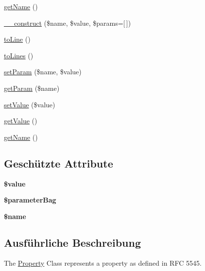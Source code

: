 \begin{DoxyCompactItemize}
\item 
\mbox{\hyperlink{class_eluceo_1_1i_cal_1_1_property_ab53aefdbce4aa167f433cac2959c2c66}{get\+Name}} ()
\item 
\mbox{\hyperlink{class_eluceo_1_1i_cal_1_1_property_aeb192572ca706cb77df02d439c3f6ce4}{\+\_\+\+\_\+construct}} (\$name, \$value, \$params=\mbox{[}$\,$\mbox{]})
\item 
\mbox{\hyperlink{class_eluceo_1_1i_cal_1_1_property_a8b154e23bd0673f5afb2b6fd450991f2}{to\+Line}} ()
\item 
\mbox{\hyperlink{class_eluceo_1_1i_cal_1_1_property_a815fd5c038ec6f86b9f117f2e3d5bb7f}{to\+Lines}} ()
\item 
\mbox{\hyperlink{class_eluceo_1_1i_cal_1_1_property_a0df0ae305338da8badb77919fbd21253}{set\+Param}} (\$name, \$value)
\item 
\mbox{\hyperlink{class_eluceo_1_1i_cal_1_1_property_aa0fea66f4397d19a9c553aabd234b26e}{get\+Param}} (\$name)
\item 
\mbox{\hyperlink{class_eluceo_1_1i_cal_1_1_property_acc3c37832aaf1876944f9c13119dfb7b}{set\+Value}} (\$value)
\item 
\mbox{\hyperlink{class_eluceo_1_1i_cal_1_1_property_a2e565cd9324a1f802c741224c9c78864}{get\+Value}} ()
\item 
\mbox{\hyperlink{class_eluceo_1_1i_cal_1_1_property_ab53aefdbce4aa167f433cac2959c2c66}{get\+Name}} ()
\end{DoxyCompactItemize}
\subsection*{Geschützte Attribute}
\begin{DoxyCompactItemize}
\item 
\mbox{\label{class_eluceo_1_1i_cal_1_1_property_a6b134305c2e64a01133701186ffecaed}} 
{\bfseries \$value}
\item 
\mbox{\label{class_eluceo_1_1i_cal_1_1_property_a53a276518453b3dae2d8aa2040a81081}} 
{\bfseries \$parameter\+Bag}
\item 
\mbox{\label{class_eluceo_1_1i_cal_1_1_property_a5a462d0fa7ea7194e2a3256e5c9b4b84}} 
{\bfseries \$name}
\end{DoxyCompactItemize}


\subsection{Ausführliche Beschreibung}
The \mbox{\hyperlink{class_eluceo_1_1i_cal_1_1_property}{Property}} Class represents a property as defined in R\+FC 5545.

